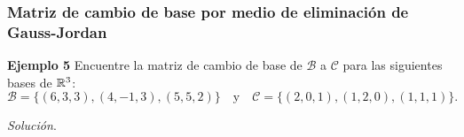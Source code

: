 \begin{frame}\frametitle{Matriz de cambio de base por medio de eliminación de Gauss-Jordan}


\begin{ej}{\textbf{Ejemplo 5}}
	Encuentre la matriz de cambio de base de $\mathcal{B}$ a $\mathcal{C}$ para las siguientes bases de $\mathbb{R}^3$:
	\[
	\mathcal{B} = \Big\{ (6,3,3), (4,-1,3), (5,5,2) \Big\} 
	\quad \text{y} \quad
	\mathcal{C} = \Big\{ (2,0,1), (1,2,0), (1,1,1) \Big\}.
	\]
\end{ej}
\textit{Solución}.

\end{frame}


\subsection{}

